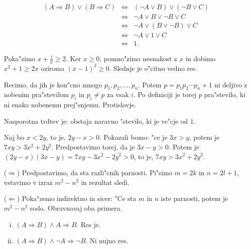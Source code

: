 \begin{answer}{1.16}

\begin{eqnarray*}
(A\Rightarrow B) \vee (B \Rightarrow C) &\Leftrightarrow & (\neg A \vee B) \vee (\neg B \vee C)\\
&\Leftrightarrow & \neg A \vee B \vee \neg B \vee C\\
&\Leftrightarrow & \neg A \vee (B \vee \neg B) \vee C\\
&\Leftrightarrow & \neg A \vee 1 \vee C\\
&\Leftrightarrow & 1.
\end{eqnarray*}

\end{answer}
\begin{answer}{1.20}
    Poka"zimo $x + \frac{1}{x}\geq 2$. Ker $x\geq 0$, pomno"zimo neenakost z $x$ in dobimo
$x^2 + 1 \geq 2x$ oziroma $(x- 1)^2\geq 0$. Slednje je o"citno vedno res.
\end{answer}
\begin{answer}{1.21}
Recimo, da jih je kon"cno mnogo $p_1,p_2,\ldots, p_n$. Potem  $p=p_1p_2\cdots p_n+1$ ni deljivo z nobenim pra"stevilom $p_i$ in $p_i\neq p$ za vsak $i$. Po definiciji je torej $p$ pra"stevilo, ki ni enako nobenemu prej"snjemu. Protislovje.
\end{answer}
\begin{answer}{1.22}
 Nasporotna trdtev je: obstaja naravno "stevilo, ki je ve"cje od $1$.
\end{answer}
\begin{answer}{1.23}
Naj bo $x<2y$, to je, $2y-x>0$. Pokazali bomo: "ce je $3x> y$, potem je $7xy > 3x^2 + 2y^2$. Predpostavimo torej, da je $3x-y>0$. Potem je $(2y-x)(3x-y)= 7xy - 3x^2 - 2y^2>0$, to je, $7xy > 3x^2 + 2y^2$.
\end{answer}
\begin{answer}{1.24}

 ($\Rightarrow$) Predpostavimo, da sta razli"cnih parnosti. Pi"simo  $m=2k$ in $n=2l+1$, vstavimo v izraz $m^2- n^2$ in rezultat sledi.

($\Leftarrow$) Poka"zemo indirektno in sicer: "Ce sta $m$ in $n$ iste parnosti, potem je $m^2- n^2$ sodo. Obravnavaj oba primera.
\end{answer}
\begin{answer}{1.26}
    \begin{enumerate}[(i)]
        \item $(A\Rightarrow B) \wedge A \Rightarrow B$. Res je.
        \item $(A\Rightarrow B) \wedge \neg A \Rightarrow \neg B$. Ni nujno res.
    \end{enumerate}
\end{answer}
